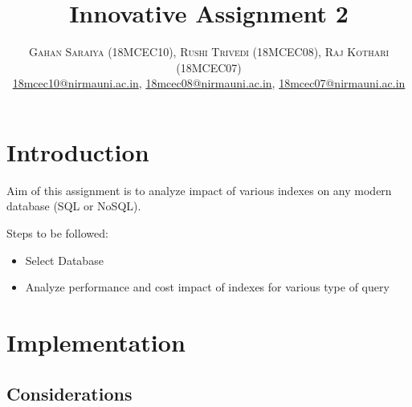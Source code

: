 \documentclass[paper=letter, fontsize=12pt]{article}
\date{}
\title{\vspace{-15mm}\fontsize{24pt}{10pt}\selectfont\textbf{Innovative Assignment 2}} %
\author{
\large
{\textsc{Gahan Saraiya (18MCEC10), Rushi Trivedi (18MCEC08), Raj Kothari (18MCEC07)}}\\[2mm]
\normalsize \href{mailto:18mcec10@nirmauni.ac.in}{18mcec10@nirmauni.ac.in}, %
\normalsize \href{mailto:18mcec10@nirmauni.ac.in}{18mcec08@nirmauni.ac.in}, %
\normalsize \href{mailto:18mcec10@nirmauni.ac.in}{18mcec07@nirmauni.ac.in}\\[2mm] %
}
\begin{document}
\maketitle %
\thispagestyle{fancy} %

\section{Introduction}\label{sec:introduction}
Aim of this assignment is to analyze impact of various indexes on any modern database (SQL or NoSQL).

Steps to be followed:
\begin{itemize}
	\item Select Database
	\item Analyze performance and cost impact of indexes for various type of query
\end{itemize}

\section{Implementation}
\label{sec:implementation}
\subsection{Considerations}
\end{document}
